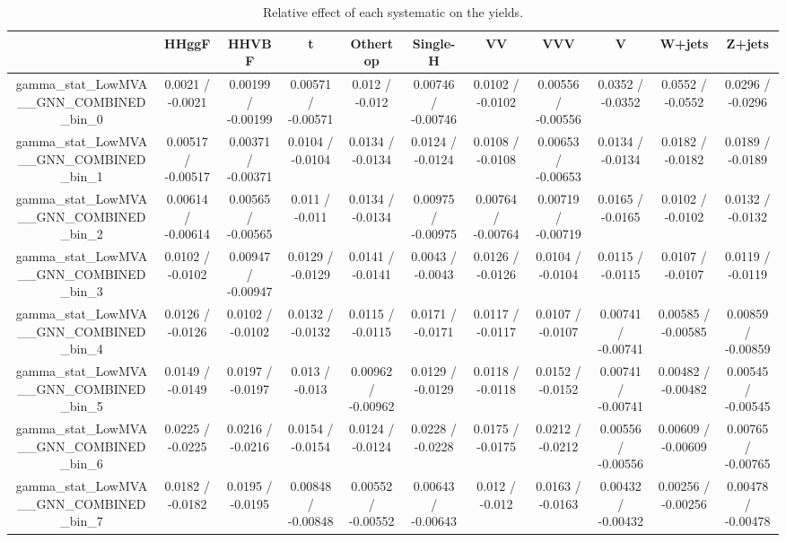 \documentclass[10pt]{article}
\begin{document}
\begin{table}[htbp]
\begin{center}
\begin{tabular}{|c|c|c|c|c|c|c|c|c|c|c|}
\hline 
      & HHggF      & HHVBF      & t      & Othertop      & Single-H      & VV      & VVV      & V      & W+jets      & Z+jets \\ 
\hline 
  gamma_stat_LowMVA__GNN_COMBINED_bin_0 & 0.0021 / -0.0021 & 0.00199 / -0.00199 & 0.00571 / -0.00571 & 0.012 / -0.012 & 0.00746 / -0.00746 & 0.0102 / -0.0102 & 0.00556 / -0.00556 & 0.0352 / -0.0352 & 0.0552 / -0.0552 & 0.0296 / -0.0296 \\ 
  gamma_stat_LowMVA__GNN_COMBINED_bin_1 & 0.00517 / -0.00517 & 0.00371 / -0.00371 & 0.0104 / -0.0104 & 0.0134 / -0.0134 & 0.0124 / -0.0124 & 0.0108 / -0.0108 & 0.00653 / -0.00653 & 0.0134 / -0.0134 & 0.0182 / -0.0182 & 0.0189 / -0.0189 \\ 
  gamma_stat_LowMVA__GNN_COMBINED_bin_2 & 0.00614 / -0.00614 & 0.00565 / -0.00565 & 0.011 / -0.011 & 0.0134 / -0.0134 & 0.00975 / -0.00975 & 0.00764 / -0.00764 & 0.00719 / -0.00719 & 0.0165 / -0.0165 & 0.0102 / -0.0102 & 0.0132 / -0.0132 \\ 
  gamma_stat_LowMVA__GNN_COMBINED_bin_3 & 0.0102 / -0.0102 & 0.00947 / -0.00947 & 0.0129 / -0.0129 & 0.0141 / -0.0141 & 0.0043 / -0.0043 & 0.0126 / -0.0126 & 0.0104 / -0.0104 & 0.0115 / -0.0115 & 0.0107 / -0.0107 & 0.0119 / -0.0119 \\ 
  gamma_stat_LowMVA__GNN_COMBINED_bin_4 & 0.0126 / -0.0126 & 0.0102 / -0.0102 & 0.0132 / -0.0132 & 0.0115 / -0.0115 & 0.0171 / -0.0171 & 0.0117 / -0.0117 & 0.0107 / -0.0107 & 0.00741 / -0.00741 & 0.00585 / -0.00585 & 0.00859 / -0.00859 \\ 
  gamma_stat_LowMVA__GNN_COMBINED_bin_5 & 0.0149 / -0.0149 & 0.0197 / -0.0197 & 0.013 / -0.013 & 0.00962 / -0.00962 & 0.0129 / -0.0129 & 0.0118 / -0.0118 & 0.0152 / -0.0152 & 0.00741 / -0.00741 & 0.00482 / -0.00482 & 0.00545 / -0.00545 \\ 
  gamma_stat_LowMVA__GNN_COMBINED_bin_6 & 0.0225 / -0.0225 & 0.0216 / -0.0216 & 0.0154 / -0.0154 & 0.0124 / -0.0124 & 0.0228 / -0.0228 & 0.0175 / -0.0175 & 0.0212 / -0.0212 & 0.00556 / -0.00556 & 0.00609 / -0.00609 & 0.00765 / -0.00765 \\ 
  gamma_stat_LowMVA__GNN_COMBINED_bin_7 & 0.0182 / -0.0182 & 0.0195 / -0.0195 & 0.00848 / -0.00848 & 0.00552 / -0.00552 & 0.00643 / -0.00643 & 0.012 / -0.012 & 0.0163 / -0.0163 & 0.00432 / -0.00432 & 0.00256 / -0.00256 & 0.00478 / -0.00478 \\ 
\hline 
\end{tabular} 
\caption{Relative effect of each systematic on the yields.} 
\end{center} 
\end{table} 
\end{document}
